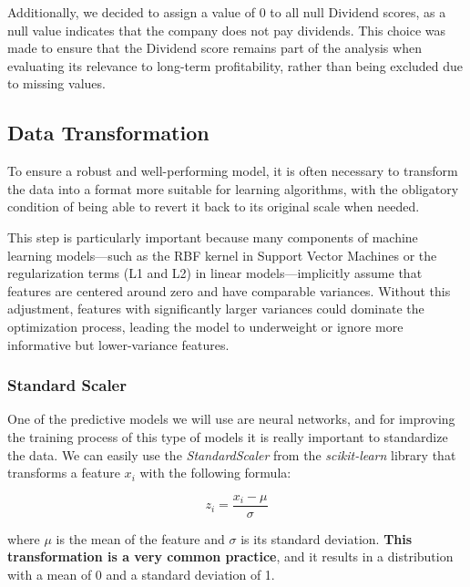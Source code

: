 \documentclass[11pt,english,a4paper,hidelinks]{book}
\begin{document}
\vspace{0.5cm}
\noindent Additionally, we decided to assign a value of 0 to all null Dividend scores, as a null value indicates that the company does not pay dividends. This choice was made to ensure that the Dividend score remains part of the analysis when evaluating its relevance to long-term profitability, rather than being excluded due to missing values.


\subsection{Data Transformation}

To ensure a robust and well-performing model, it is often necessary to transform the data into a format more suitable for learning algorithms, with the obligatory condition of being able to revert it back to its original scale when needed. 

\vspace{0.5cm}
\noindent This step is particularly important because many components of machine learning models—such as the RBF kernel in Support Vector Machines or the regularization terms (L1 and L2) in linear models—implicitly assume that features are centered around zero and have comparable variances. Without this adjustment, features with significantly larger variances could dominate the optimization process, leading the model to underweight or ignore more informative but lower-variance features.

\subsubsection{Standard Scaler}
One of the predictive models we will use are neural networks, and for improving the training process of this type of models it is really important to standardize the data. We can easily use the \textit{StandardScaler} from the \textit{scikit-learn} library that transforms a feature \(x_i\) with the following formula:

\begin{equation}
z_i = \frac{x_i - \mu}{\sigma}
\end{equation}

\noindent where \(\mu\) is the mean of the feature and \(\sigma\) is its standard deviation. \textbf{This transformation is a very common practice}, and it results in a distribution with a mean of 0 and a standard deviation of 1.
\end{document}
